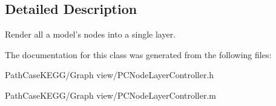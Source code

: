 \subsection{Detailed Description}
Render all a model's nodes into a single layer. 

The documentation for this class was generated from the following files:\begin{DoxyCompactItemize}
\item 
PathCaseKEGG/Graph view/PCNodeLayerController.h\item 
PathCaseKEGG/Graph view/PCNodeLayerController.m\end{DoxyCompactItemize}
